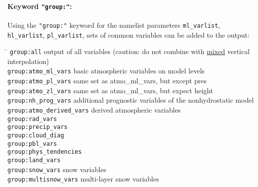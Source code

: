 \paragraph{Keyword \texttt{"group:"}:}
Using the \texttt{"group:"} keyword for the namelist parameters \texttt{ml\_varlist}, \texttt{hl\_varlist}, \texttt{pl\_varlist},
sets of common variables can be added to the output:
\begin{tabbing}
\hspace*{0.4\textwidth} \= \kill
\texttt{group:all}                     \>      output of all variables (caution: do not combine with \underline{mixed} vertical interpolation) \\
\texttt{group:atmo\_ml\_vars}          \>      basic atmospheric variables on model levels                          \\
\texttt{group:atmo\_pl\_vars}          \>      same set as atmo\_ml\_vars, but except pres\\
\texttt{group:atmo\_zl\_vars}          \>      same set as atmo\_ml\_vars, but expect height\\
\texttt{group:nh\_prog\_vars}          \>      additional prognostic variables of the nonhydrostatic model          \\
\texttt{group:atmo\_derived\_vars}     \>      derived atmospheric variables                                        \\
\texttt{group:rad\_vars}               \>                                                                           \\
\texttt{group:precip\_vars}            \>                                                                           \\
\texttt{group:cloud\_diag}             \>                                                                           \\
\texttt{group:pbl\_vars}               \>                                                                           \\
\texttt{group:phys\_tendencies}        \>                                                                           \\
\texttt{group:land\_vars}              \>                                                                           \\
\texttt{group:snow\_vars}              \>     snow variables                                                        \\
\texttt{group:multisnow\_vars}         \>     multi-layer snow variables                                            \\

\end{tabbing}
